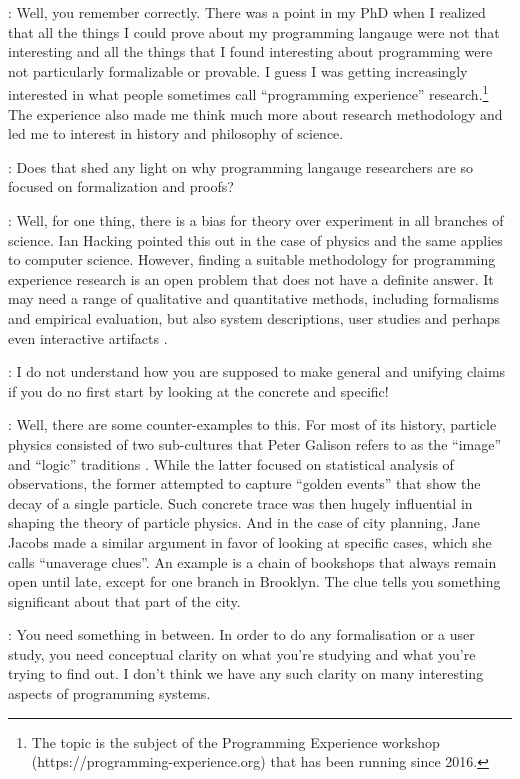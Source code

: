 \documentclass[runningheads]{llncs}
\newcommand{\T}{Tomas}
\newcommand{\J}{Joel}
\newcommand{\says}[2][gg]{\vspace{0.5em}\noindent\hangindent=0.5cm{\textsc{#1}}: #2}
\begin{document}
\says[\T]{Well, you remember correctly. There was a point in my PhD when I realized that all the things I could prove about my programming langauge were not that interesting and all the things that I found interesting about programming were not particularly formalizable or provable. I guess I was getting increasingly interested in what people sometimes call ``programming experience'' research.\footnote{The topic is the subject of the Programming Experience workshop (https://programming-experience.org) that has been running since 2016.} The experience also made me think much more about research methodology and led me to interest in history and philosophy of science.}

\says[\J]{Does that shed any light on why programming langauge researchers are so focused on formalization and proofs?}

\says[\T]{Well, for one thing, there is a bias for theory over experiment in all branches of science. Ian Hacking \cite{hacking-1983-representing} pointed this out in the case of physics and the same applies to computer science. However, finding a suitable methodology for programming experience research is an open problem that does not have a definite answer. It may need a range of qualitative and quantitative methods, including formalisms and empirical evaluation, but also system descriptions, user studies and perhaps even interactive artifacts \cite{edwards-2019-eval}.}

\says[\J]{I do not understand how you are supposed to make general and unifying claims if you do no first start by looking at the concrete and specific!}

\says[\T]{Well, there are some counter-examples to this. For most of its history, particle physics consisted of two sub-cultures that Peter Galison refers to as the ``image'' and ``logic'' traditions \cite{galison-1997-image}. While the latter focused on statistical analysis of observations, the former attempted to capture ``golden events'' that show the decay of a single particle. Such concrete trace was then hugely influential in shaping the theory of particle physics. And in the case of city planning, Jane Jacobs made a similar argument \cite{jacobs-1961-death} in favor of looking at specific cases, which she calls ``unaverage clues''. An example is a chain of bookshops that always remain open until late, except for one branch in Brooklyn. The clue tells you something significant about that part of the city.}

\says[\J]{You need something in between. In order to do any formalisation or a user study, you need conceptual clarity on what you're studying and what you're trying to find out. I don't think we have any such clarity on many interesting aspects of programming systems.}
\end{document}

